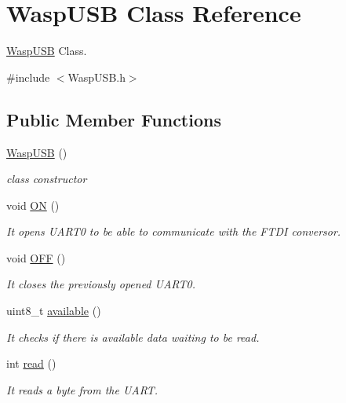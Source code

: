 \hypertarget{class_wasp_u_s_b}{}\section{Wasp\+U\+SB Class Reference}
\label{class_wasp_u_s_b}


\hyperlink{class_wasp_u_s_b}{Wasp\+U\+SB} Class.  




{\ttfamily \#include $<$Wasp\+U\+S\+B.\+h$>$}

\subsection*{Public Member Functions}
\begin{DoxyCompactItemize}
\item 
\hyperlink{class_wasp_u_s_b_a9ebe26bdbbfd93f5167b65d031716aa1}{Wasp\+U\+SB} ()
\begin{DoxyCompactList}\small\item\em class constructor \end{DoxyCompactList}\item 
void \hyperlink{class_wasp_u_s_b_a95f2630ed077735e742db92300f86736}{ON} ()
\begin{DoxyCompactList}\small\item\em It opens U\+A\+R\+T0 to be able to communicate with the F\+T\+DI conversor. \end{DoxyCompactList}\item 
void \hyperlink{class_wasp_u_s_b_a70ada98efa6ea6309c9e323cdca6768a}{O\+FF} ()
\begin{DoxyCompactList}\small\item\em It closes the previously opened U\+A\+R\+T0. \end{DoxyCompactList}\item 
uint8\+\_\+t \hyperlink{class_wasp_u_s_b_a265fc1a0c2036c353eebed95ab00eeb6}{available} ()
\begin{DoxyCompactList}\small\item\em It checks if there is available data waiting to be read. \end{DoxyCompactList}\item 
int \hyperlink{class_wasp_u_s_b_ab9635136bbf8bb0911434a543b44aaff}{read} ()
\begin{DoxyCompactList}\small\item\em It reads a byte from the U\+A\+RT. \end{DoxyCompactList}\item 

\end{DoxyCompactItemize}
